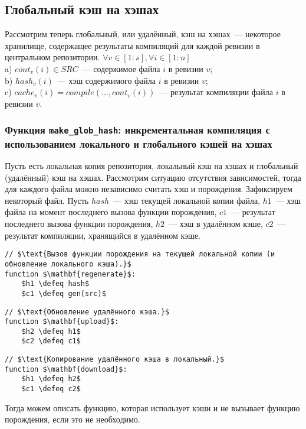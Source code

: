 \subsection{Глобальный кэш на хэшах}

Рассмотрим теперь глобальный, или удалённый, кэш на хэшах~--- некоторое хранилище, содержащее результаты компиляций для каждой ревизии в центральном репозитории.
$\forall v \in [1:s], \forall i \in [1:n]$\\
\indent a) $cont_v(i) \in SRC$~--- содержимое файла $i$ в ревизии $v$;\\
\indent b) $hash_v(i)$~--- хэш содержимого файла $i$ в ревизии $v$;\\
\indent c) $cache_v(i) = compile(..., cont_v(i))$~--- результат компиляции файла $i$ в ревизии $v$.\\

\subsubsection[Функция \texttt{make\_glob\_hash}]{Функция \texttt{make\_glob\_hash}: инкрементальная компиляция с использованием локального и глобального кэшей на хэшах}
Пусть есть локальная копия репозитория, локальный кэш на хэшах и глобальный (удалённый) кэш на хэшах. Рассмотрим ситуацию отсутствия зависимостей, тогда для каждого файла можно независимо считать хэш и порождения.
Зафиксируем некоторый файл. Пусть $hash$~--- хэш текущей локальной копии файла, $h1$~--- хэш файла на момент последнего вызова функции порождения, $c1$~--- результат последнего вызова функции порождения, $h2$~--- хэш в удалённом кэше, $c2$~--- результат компиляции, хранящийся в удалённом кэше.

\begin{lstlisting}
// $\text{Вызов функции порождения на текущей локальной копии (и обновление локального кэша).}$
function $\mathbf{regenerate}$:
	$h1 \defeq hash$
	$c1 \defeq gen(src)$
\end{lstlisting}
\begin{lstlisting}
// $\text{Обновление удалённого кэша.}$
function $\mathbf{upload}$:
	$h2 \defeq h1$
	$c2 \defeq c1$
\end{lstlisting}
\begin{lstlisting}
// $\text{Копирование удалённого кэша в локальный.}$
function $\mathbf{download}$:
	$h1 \defeq h2$
	$c1 \defeq c2$
\end{lstlisting}

Тогда можем описать функцию, которая использует кэши и не вызывает функцию порождения, если это не необходимо.

